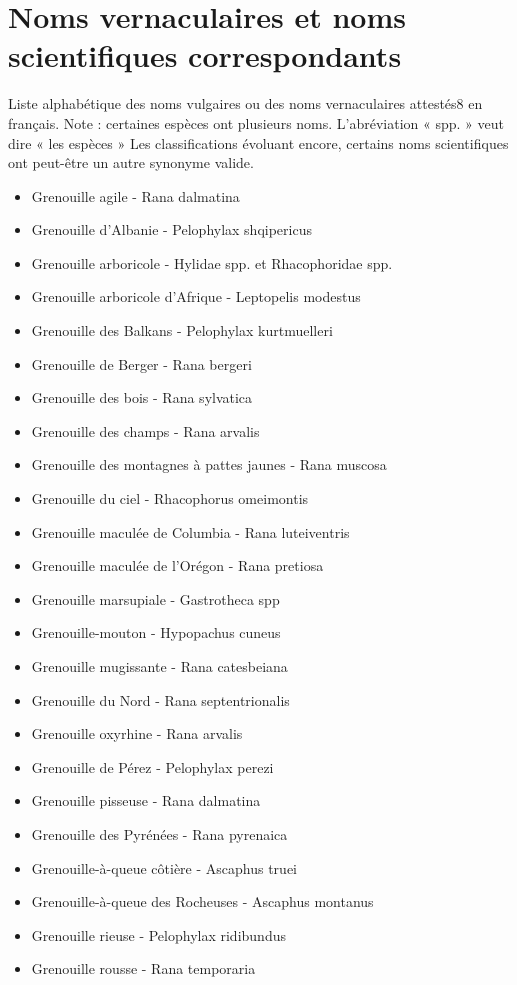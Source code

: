 \documentclass[10pt,a4paper]{article}
\begin{document}

\section{Noms vernaculaires et noms scientifiques correspondants}
 
 Liste alphabétique des noms vulgaires ou des noms vernaculaires attestés8 en français.
Note : certaines espèces ont plusieurs noms. L'abréviation « spp. » veut dire « les espèces »
Les classifications évoluant encore, certains noms scientifiques ont peut-être un autre synonyme valide.

\begin{multicols}{2}
    \begin{itemize}
  
\item Grenouille agile - Rana dalmatina 
\item Grenouille d'Albanie - Pelophylax shqipericus 
\item Grenouille arboricole - Hylidae spp. et Rhacophoridae spp.
\item Grenouille arboricole d'Afrique - Leptopelis modestus 
\item Grenouille des Balkans - Pelophylax kurtmuelleri 
\item Grenouille de Berger - Rana bergeri 
\item Grenouille des bois - Rana sylvatica 
\item Grenouille des champs - Rana arvalis 
\item Grenouille des montagnes à pattes jaunes - Rana muscosa
\item Grenouille du ciel - Rhacophorus omeimontis 
\item Grenouille maculée de Columbia - Rana luteiventris 
\item Grenouille maculée de l'Orégon - Rana pretiosa 
\item Grenouille marsupiale - Gastrotheca spp 
\item Grenouille-mouton - Hypopachus cuneus 
\item Grenouille mugissante - Rana catesbeiana
\item Grenouille du Nord - Rana septentrionalis 
\item Grenouille oxyrhine - Rana arvalis
\item Grenouille de Pérez - Pelophylax perezi 
\item Grenouille pisseuse - Rana dalmatina
\item Grenouille des Pyrénées - Rana pyrenaica 
\item Grenouille-à-queue côtière - Ascaphus truei 
\item Grenouille-à-queue des Rocheuses - Ascaphus montanus 
\item Grenouille rieuse - Pelophylax ridibundus 
\item Grenouille rousse - Rana temporaria 
\end{itemize}
\end{multicols}    
\end{document}
